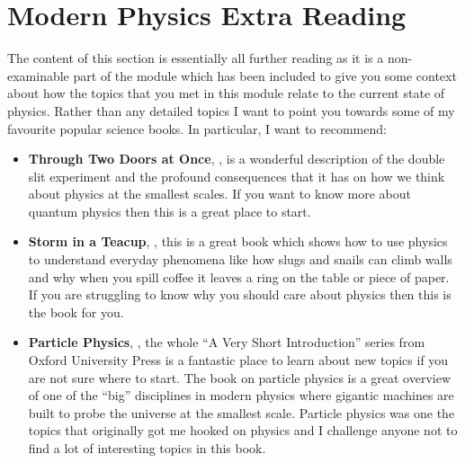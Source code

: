 \section{Modern Physics Extra Reading}
The content of this section is essentially all further reading as it is a non-examinable part of the module which has been included to give you some context about how the topics that you met in this module relate to the current state of physics. Rather than any detailed topics I want to point you towards some of my favourite popular science books. In particular, I want to recommend:

\begin{itemize}
\setlength{\itemsep}{-5pt}
    \item \textbf{Through Two Doors at Once}, \citep{ananthaswamy2020through}, is a wonderful description of the double slit experiment and the profound consequences that it has on how we think about physics at the smallest scales. If you want to know more about quantum physics then this is a great place to start.
    
\item \textbf{Storm in a Teacup}, \citep{czerski2016storm}, this is a great book which shows how to use physics to understand everyday phenomena like how slugs and snails can climb walls and why when you spill coffee it leaves a ring on the table or piece of paper. If you are struggling to know why you should care about physics then this is the book for you. 

\item \textbf{Particle Physics},  \citep{close2023particle}, the whole ``A Very Short Introduction'' series from Oxford University Press is a fantastic place to learn about new topics if you are not sure where to start. The book on particle physics is a great overview of one of the ``big'' disciplines in modern physics where gigantic machines are built to probe the universe at the smallest scale. Particle physics was one the topics that originally got me hooked on physics and I challenge anyone not to find a lot of interesting topics in this book.
\end{itemize}  